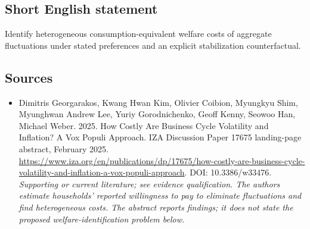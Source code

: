 \documentclass[11pt]{article}
\begin{document}
\subsection{Short English statement}
Identify heterogeneous consumption-equivalent welfare costs of aggregate fluctuations under stated preferences and an explicit stabilization counterfactual.

\subsection{Sources}
\begin{itemize}\raggedright
\item[\textnormal{[S1]}]\hypertarget{source:30007518:1}{} Dimitris Georgarakos, Kwang Hwan Kim, Olivier Coibion, Myungkyu Shim, Myunghwan Andrew Lee, Yuriy Gorodnichenko, Geoff Kenny, Seowoo Han, Michael Weber. 2025. How Costly Are Business Cycle Volatility and Inflation? A Vox Populi Approach. IZA Discussion Paper 17675 landing-page abstract, February 2025.
\url{https://www.iza.org/en/publications/dp/17675/how-costly-are-business-cycle-volatility-and-inflation-a-vox-populi-approach}.
DOI: 10.3386/w33476.
{\small\textit{Supporting or current literature; see evidence qualification. The authors estimate households’ reported willingness to pay to eliminate fluctuations and find heterogeneous costs. The abstract reports findings; it does not state the proposed welfare-identification problem below.}}
\end{itemize}
\end{document}
